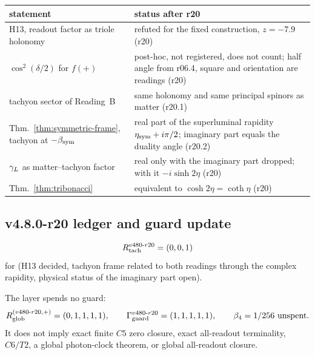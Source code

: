\begin{center}
\small
\begin{tabular}{@{}>{\raggedright\arraybackslash}p{}>{\raggedright\arraybackslash}p{}@{}}
\toprule
statement & status after r20\\
\midrule
H13, readout factor as triole holonomy & refuted for the fixed construction, \(z=-7.9\) (r20)\\
\(\cos^2(\delta/2)\) for \(f(+)\) & post-hoc, not registered, does not count; half angle from r06.4, square and orientation are readings (r20)\\
tachyon sector of Reading~B & same holonomy and same principal spinors as matter (r20.1)\\
Thm.~\ref{thm:symmetric-frame}, tachyon at \(-\beta_{\mathrm{sym}}\) & real part of the superluminal rapidity \(\eta_{\rm sym}+i\pi/2\); imaginary part equals the duality angle (r20.2)\\
\(\gamma_L\) as matter--tachyon factor & real only with the imaginary part dropped; with it \(-i\sinh2\eta\) (r20)\\
Thm.~\ref{thm:tribonacci} & equivalent to \(\cosh2\eta=\coth\eta\) (r20)\\
\bottomrule
\end{tabular}
\end{center}

\subsection*{v4.8.0-r20 ledger and guard update}
\label{subsec:v480-r20-ledger-guard}

\[
R_{\rm tach}^{v480\text{-}r20}=(0,0,1)
\]
for (H13 decided, tachyon frame related to both readings through the complex rapidity, physical status of the
imaginary part open).

The layer spends no guard:
\[
R_{\rm glob}^{(v480\text{-}r20,+)}=(0,1,1,1,1),
\qquad
\Gamma_{\rm guard}^{v480\text{-}r20}=(1,1,1,1,1),
\qquad
\beta_4=1/256\ \text{unspent}.
\]
It does not imply exact finite \(C5\) zero closure, exact all-readout terminality,
\(C6/T2\), a global photon-clock theorem, or global all-readout closure.
